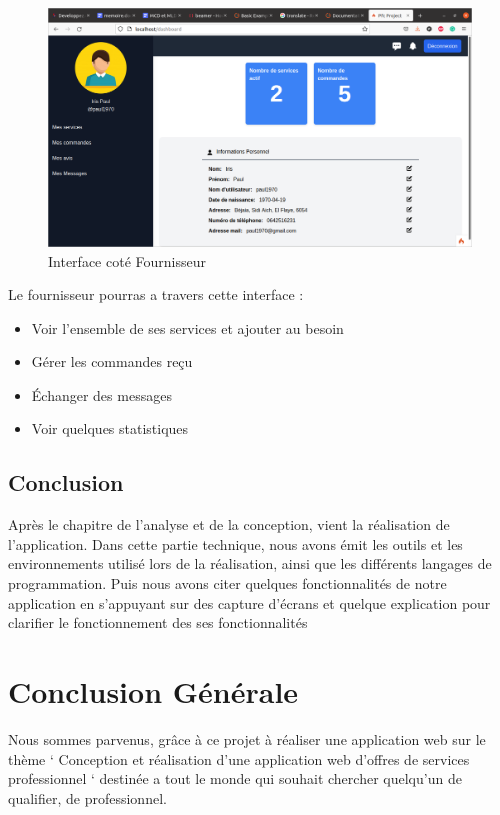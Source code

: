 \documentclass[french]{report}
\begin{document}
\begin{figure}[H]
    \centering
    \includegraphics[width=1\textwidth]{images/fourni main.png} 
    \caption{Interface coté Fournisseur}
\end{figure}

Le fournisseur pourras a travers cette interface : 
\begin{itemize}
    \item Voir l'ensemble de ses services et ajouter au besoin
    \item Gérer les commandes reçu
    \item Échanger des messages
    \item Voir quelques statistiques
    
\end{itemize}

\subsection{Conclusion}

Après le chapitre de l'analyse et de la conception, vient la réalisation de
l'application. Dans cette partie technique, nous avons émit les outils et les
environnements utilisé lors de la réalisation, ainsi que les différents langages
de programmation. Puis nous avons citer quelques fonctionnalités de notre
application en s'appuyant sur des capture d'écrans et quelque explication pour
clarifier le fonctionnement des ses fonctionnalités


\section{Conclusion Générale}

Nous sommes parvenus, grâce à ce projet à réaliser une application web sur le
thème ‘ Conception et réalisation d'une application web d'offres de services
professionnel ‘  destinée a tout le monde qui souhait chercher quelqu'un de
qualifier, de professionnel.
\end{document}
